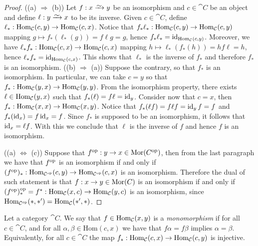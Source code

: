 \begin{proof}
  ((a) \(\Rightarrow\) (b)) Let \(f: x \isoto y\) be an isomorphism and \(c
  \in \cat C\) be an object and define \(\ell : y \isoto x\) to be its inverse.
  Given \(c \in \cat C\), define \(\ell_*: \operatorname{Hom}_{\mathcal C}(c, y) \to \operatorname{Hom}_{\mathcal
  C}(c, x)\). Notice that \(f_* \ell_* : \operatorname{Hom}_{\mathcal C}(c, y) \to
  \operatorname{Hom}_{\mathcal C}(c, y)\) mapping \(g \mapsto f_*(\ell_*(g)) = f \ell
  g = g\), hence \(f_* \ell_* = \operatorname{id}_{\operatorname{Hom}_{\mathcal C}(c, y)}\). Moreover, we
  have \(\ell_* f_* : \operatorname{Hom}_{\mathcal C}(c, x) \to \operatorname{Hom}_{\mathcal C}(c, x)\)
  mapping \(h \mapsto \ell_*(f_*(h)) = h f \ell = h\), hence
  \(\ell_* f_* = \operatorname{id}_{\operatorname{Hom}_{\mathcal C}(c, x)}\). This shows that \(\ell_*\)
  is the inverse of \(f_*\) and therefore \(f_*\) is an isomorphism. ((b)
  \(\Rightarrow\) (a)) Suppose the contrary, so that \(f_*\) is an isomorphism.
  In particular, we can take \(c = y\) so that \(f_*: \operatorname{Hom}_{\mathcal C}(y, x) \to
  \operatorname{Hom}_{\mathcal C}(y, y)\). From the isomorphism property, there exists \(\ell \in
  \operatorname{Hom}_{\mathcal C}(y, x)\) such that \(f_*(\ell) = f \ell = \operatorname{id}_y\). Consider
  now that \(c = x\), then \(f_*: \operatorname{Hom}_{\mathcal C}(x, x) \to \operatorname{Hom}_{\mathcal C}(x, y)\).
  Notice that \(f_*(\ell f) = f \ell f = \operatorname{id}_y f = f\)
  and \(f_*(\operatorname{id}_x) = f \operatorname{id}_x = f\). Since \(f_*\) is supposed to be an
  isomorphism, it follows that \(\operatorname{id}_x = \ell f\). With this we conclude
  that \(\ell\) is the inverse of \(f\) and hence \(f\) is an isomorphism.

  ((a) \(\Leftrightarrow\) (c)) Suppose that \(f^{\mathrm{op}}: y \to x \in \mathcal
  {\operatorname{Mor}}(C^{\mathrm{op}})\), then from the last paragraph we have that \(f^{\mathrm{op}}\) is an
  isomorphism if and only if \((f^{\mathrm{op}})_* : \operatorname{Hom}_{\mathcal C^{\mathrm{op}}}(c, y) \to
  \operatorname{Hom}_{\mathcal C^{\mathrm{op}}}(c, x)\) is an isomorphism. Therefore the dual of such
  statement is that \(f: x \to y \in \mathcal {\operatorname{Mor}}(C)\) is an isomorphism if and
  only if \((f^{\mathrm{op}})_*^{\mathrm{op}} = f^*: \operatorname{Hom}_{\mathcal C}(x, c) \to \operatorname{Hom}_{\mathcal C}(y, c)\)
  is an isomorphism, since \(\operatorname{Hom}_{\mathcal C^{\mathrm{op}}}(*, *') = \operatorname{Hom}_{\mathcal C}(*', *)\).
\end{proof}

\begin{definition}[Monomorphism]\label{def: monomorphism}
  Let a category \(\cat{C}\). We say that \(f \in \operatorname{Hom}_{\mathcal C}(x, y)\) is a
  \emph{monomorphism} if for all \(c \in \cat{C}\), and for all \(\alpha, \beta
  \in \mathrm{Hom}(c, x)\) we have that \(f \alpha = f \beta\) implies \(\alpha
  = \beta\). Equivalently, for all \(c \in \cat C\) the map \(f_*: \operatorname{Hom}_{\mathcal
  C}(c, x) \to \operatorname{Hom}_{\mathcal C}(c, y)\) is injective.
\end{definition}

